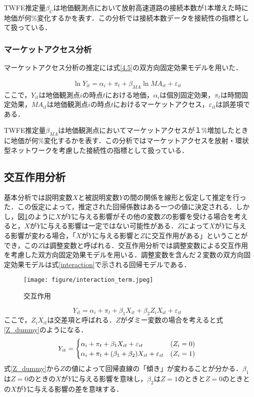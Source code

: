 TWFE推定量$\beta_{C}$は地価観測点において放射高速道路の接続本数が1本増えた時に地価が何\%変化するかを表す．この分析では接続本数データを接続性の指標として扱っている．

\subsubsection{マーケットアクセス分析}
マーケットアクセス分析の推定には式\ref{4.5}の双方向固定効果モデルを用いた．

\begin{eqnarray}
  \ln{Y_{it}}= \alpha_{i} + \pi_{t} + \beta_{MA}\ln{{MA}_{it}}+ \varepsilon_{it}
    \label{4.5}
\end{eqnarray}  
ここで，$Y_{it}$は地価観測点$i$の時点$t$における地価，$\alpha_{i}$は個別固定効果，$\pi_{t}$は時間固定効果，$MA_{it}$は地価観測点$i$の時点$t$におけるマーケットアクセス，$\varepsilon_{it}$は誤差項である．

TWFE推定量$\beta_{MA}$は地価観測点においてマーケットアクセスが１\%増加したときに地価が何\%変化するかを表す．この分析ではマーケットアクセスを放射・環状型ネットワークを考慮した接続性の指標として扱っている．




\subsection{交互作用分析}
基本分析では説明変数$X$と被説明変数$Y$の間の関係を線形と仮定して推定を行った．この仮定によって，推定された回帰係数はある一つの値に決定される．しかし，図\ref{interaction_term}のように$X$が$Y$に与える影響がその他の変数$Z$の影響を受ける場合を考えると，$X$が$Y$に与える影響は一定ではない可能性がある．$Z$によって$X$が$Y$に与える影響が変わる場合，「$X$が$Y$に与える影響と$Z$に交互作用がある」ということができ，この$Z$は調整変数と呼ばれる．交互作用分析では調整変数による交互作用を考慮した双方向固定効果モデルを用いる．調整変数を含んだ２変数の双方向固定効果モデルは式\ref{interaction}で示される回帰モデルである．
\begin{figure}[H]
  \centering
  \texttt{[image: figure/interaction\_term.jpeg]}
  \caption{交互作用}
  \label{interaction_term}
\end{figure}
\begin{equation}
  Y_{it} = \alpha_{i} + \pi_{t} + \beta_{1}X_{it} + \beta_{2}Z_{i}X_{it} + \varepsilon_{it}
  \label{interaction}
\end{equation}
ここで，$Z_{i}X_{it}$は交差項と呼ばれる．$Z$がダミー変数の場合を考えると式\ref{Z_dummy}のようになる．
\begin{equation}
  Y_{it} =
  \begin{cases}
    \alpha_{i} + \pi_{t} + \beta_{1}X_{it}  + \varepsilon_{it} & \text (Z_{i} = 0) \\
    \alpha_{i} + \pi_{t} + (\beta_{1}+\beta_{2})X_{it} + \varepsilon_{it} & \text (Z_{i} = 1)
  \end{cases}
  \label{Z_dummy}
\end{equation}
式\ref{Z_dummy}から$Z$の値によって回帰直線の「傾き」が変わることが分かる．$\beta_{1}$は$Z=0$のときの$X$が$Y$に与える影響を意味し，$\beta_{2}$は$Z=1$のときと$Z=0$のときとの$X$が$Y$に与える影響の差を意味する．


